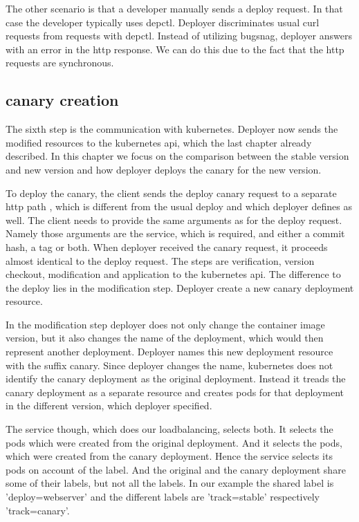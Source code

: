 The other scenario is that a developer manually sends a deploy request. In that case
the developer typically uses depctl. Deployer discriminates usual curl requests from
requests with depctl. Instead of utilizing bugsnag, deployer answers with an error in the
http response. We can do this due to the fact that the http requests are synchronous.

\subsection{canary creation}
The sixth step is the communication with kubernetes. Deployer now sends the modified
resources to the kubernetes api, which the last chapter already described. In this chapter
we focus on the comparison between the stable version and new version and how deployer
deploys the canary for the new version.

To deploy the canary, the client sends the deploy canary request to a separate http path ,
which is different from the usual deploy and which deployer defines as well. The client
needs to provide the same arguments as for the deploy request. Namely those arguments are
the service, which is required, and either a commit hash, a tag or both. When deployer
received the canary request, it proceeds almost identical to the deploy request. The steps
are verification, version checkout, modification and application to the kubernetes
api. The difference to the deploy lies in the modification step. Deployer create a new
canary deployment resource.

In the modification step deployer does not only change the container image version, but it
also changes the name of the deployment, which would then represent another
deployment. Deployer names this new deployment resource with the suffix canary. Since
deployer changes the name, kubernetes does not identify the canary deployment as the
original deployment. Instead it treads the canary deployment as a separate resource and
creates pods for that deployment in the different version, which deployer specified.

The service though, which does our loadbalancing, selects both. It selects the pods which
were created from the original deployment. And it selects the pods, which were created
from the canary deployment. Hence the service selects its pods on account of the
label. And the original and the canary deployment share some of their labels, but not all
the labels. In our example the shared label is 'deploy=webserver' and the different labels
are 'track=stable' respectively 'track=canary'.

